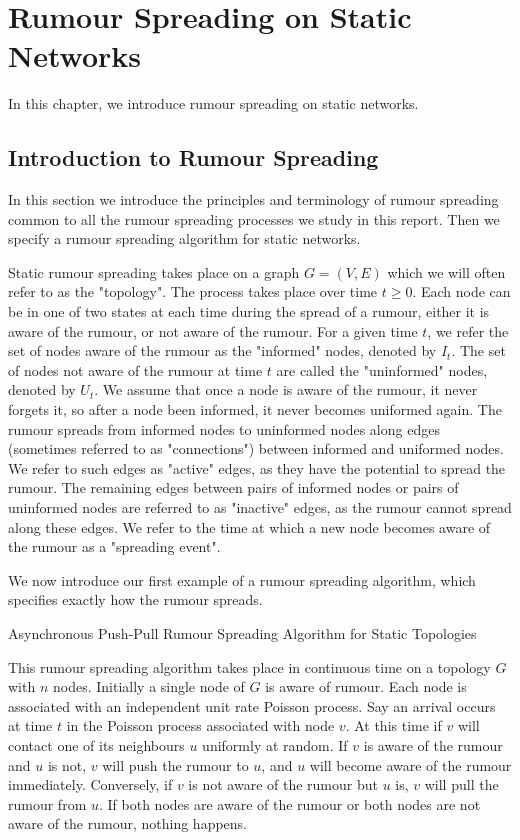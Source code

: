 \chapter{Rumour Spreading on Static Networks}\label{chapter:staticIntro}

In this chapter, we introduce rumour spreading on static networks.

\section{Introduction to Rumour Spreading}

In this section we introduce the principles and terminology of rumour spreading common to all the rumour spreading processes we study in this report. Then we specify a rumour spreading algorithm for static networks.

Static rumour spreading takes place on a graph $G=(V,E)$ which we will often refer to as the "topology". The process takes place over time $t \geq 0$. Each node can be in one of two states at each time during the spread of a rumour, either it is aware of the rumour, or not aware of the rumour. For a given time $t$, we refer the set of nodes aware of the rumour as the "informed" nodes, denoted by $I_t$. The set of nodes not aware of the rumour at time $t$ are called the "uninformed" nodes, denoted by $U_t$. We assume that once a node is aware of the rumour, it never forgets it, so after a node been informed, it never becomes uniformed again. The rumour spreads from informed nodes to uninformed nodes along edges (sometimes referred to as "connections") between informed and uniformed nodes. We refer to such edges as "active" edges, as they have the potential to spread the rumour. The remaining edges between pairs of informed nodes or pairs of uninformed nodes are referred to as "inactive" edges, as the rumour cannot spread along these edges. We refer to the time at which a new node becomes aware of the rumour as a "spreading event".

We now introduce our first example of a rumour spreading algorithm, which specifies exactly how the rumour spreads.  

\begin{definition}\label{algo:staticAsync}
	Asynchronous Push-Pull Rumour Spreading Algorithm for Static Topologies

	\noindent
	This rumour spreading algorithm takes place in continuous time on a topology $G$ with $n$ nodes.
	Initially a single node of $G$ is aware of rumour. Each node is associated with an independent unit rate Poisson process. Say an arrival occurs at time $t$ in the Poisson process associated with node $v$. At this time if $v$ will contact one of its neighbours $u$ uniformly at random. If $v$ is aware of the rumour and $u$ is not, $v$ will push the rumour to $u$, and $u$ will become aware of the rumour immediately. Conversely, if $v$ is not aware of the rumour but $u$ is, $v$ will pull the rumour from $u$. If both nodes are aware of the rumour or both nodes are not aware of the rumour, nothing happens.
\end{definition}

